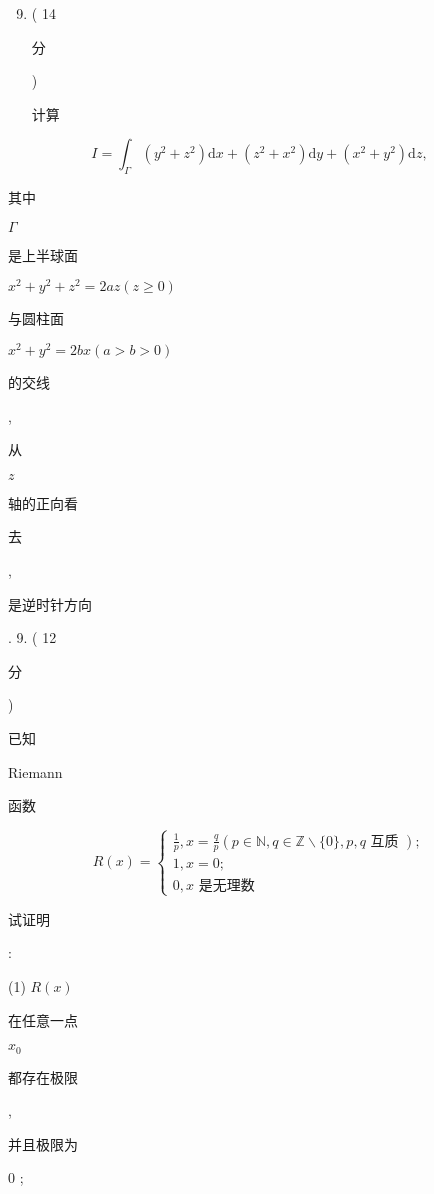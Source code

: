 \documentclass[10pt]{article}
\begin{document}
\begin{enumerate}
  \setcounter{enumi}{8}
  \item ( 14 \begin{CJK}{UTF8}{mj}分\end{CJK}) \begin{CJK}{UTF8}{mj}计算\end{CJK}
\end{enumerate}
$$
I=\int_{\Gamma}\left(y^{2}+z^{2}\right) \mathrm{d} x+\left(z^{2}+x^{2}\right) \mathrm{d} y+\left(x^{2}+y^{2}\right) \mathrm{d} z,
$$
\begin{CJK}{UTF8}{mj}其中\end{CJK} $\Gamma$ \begin{CJK}{UTF8}{mj}是上半球面\end{CJK} $x^{2}+y^{2}+z^{2}=2 a z(z \geqslant 0)$ \begin{CJK}{UTF8}{mj}与圆柱面\end{CJK} $x^{2}+y^{2}=2 b x(a>b>0)$ \begin{CJK}{UTF8}{mj}的交线\end{CJK}, \begin{CJK}{UTF8}{mj}从\end{CJK} $z$ \begin{CJK}{UTF8}{mj}轴的正向看\end{CJK} \begin{CJK}{UTF8}{mj}去\end{CJK}, \begin{CJK}{UTF8}{mj}是逆时针方向\end{CJK}. 9. ( 12 \begin{CJK}{UTF8}{mj}分\end{CJK}) \begin{CJK}{UTF8}{mj}已知\end{CJK} Riemann \begin{CJK}{UTF8}{mj}函数\end{CJK}
$$
R(x)=\left\{\begin{array}{l}
\frac{1}{p}, x=\frac{q}{p}(p \in \mathbb{N}, q \in \mathbb{Z} \backslash\{0\}, p, q \text { 互质 }) ; \\
1, x=0 ; \\
0, x \text { 是无理数 }
\end{array}\right.
$$
\begin{CJK}{UTF8}{mj}试证明\end{CJK}:

(1) $R(x)$ \begin{CJK}{UTF8}{mj}在任意一点\end{CJK} $x_{0}$ \begin{CJK}{UTF8}{mj}都存在极限\end{CJK}, \begin{CJK}{UTF8}{mj}并且极限为\end{CJK} 0 ;
\end{document}

